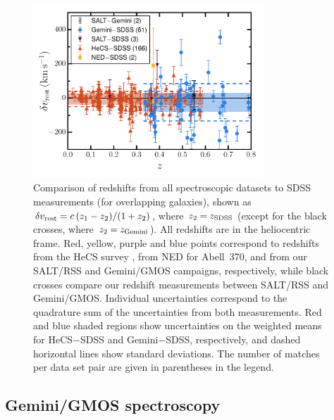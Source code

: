 \begin{figure}
 \centerline{\includegraphics[width=3.4in]{chapter3/compare_redshifts.pdf}}
\caption{Comparison of redshifts from all spectroscopic datasets to SDSS measurements (for 
overlapping galaxies), shown as $\delta v_{\rm rest}=c\,(z_1-z_2)/(1+z_2)$, where $z_2=z_{\rm 
SDSS}$ (except for the black crosses, where $z_2=z_{\rm Gemini}$). All redshifts are in the 
heliocentric frame. Red, yellow, purple and blue points correspond to redshifts from the HeCS 
survey \citep{rines13}, from NED for Abell~370, and from our SALT/RSS and Gemini/GMOS campaigns, 
respectively, while black crosses compare our redshift measurements between SALT/RSS and 
Gemini/GMOS. Individual uncertainties correspond to the quadrature sum of the uncertainties from 
both measurements. Red and blue shaded regions show uncertainties on the weighted means for 
HeCS$-$SDSS and Gemini$-$SDSS, respectively, and dashed horizontal lines show standard deviations. 
The number of matches per data set pair are given in parentheses in the legend.}
\label{f:redshift_comparison}
\end{figure}

\subsection{Gemini/GMOS spectroscopy}\label{s:spectroscopy}

